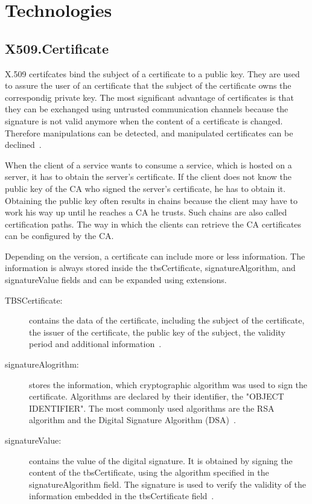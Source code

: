 \section{Technologies}
\subsection{X509.Certificate}
X.509 certifcates bind the subject of a certificate to a public key.
They are used to assure the user of an certificate that the subject of the certificate owns the correspondig private key.
The most significant advantage of certificates is that they can be exchanged using untrusted communication channels because the signature is not valid anymore when the content of a certificate is changed.
Therefore manipulations can be detected, and manipulated certificates can be declined~\cite{x509rfc}.

When the client of a service wants to consume a service, which is hosted on a server, it has to obtain the server's certificate.
If the client does not know the public key of the CA who signed the server's certificate, he has to obtain it.
Obtaining the public key often results in chains because the client may have to work his way up until he reaches a CA he trusts.
Such chains are also called certification paths.
The way in which the clients can retrieve the CA certificates can be configured by the CA.

Depending on the version, a certificate can include more or less information.
The information is always stored inside the tbsCertificate, signatureAlgorithm, and signatureValue fields and can be expanded using extensions.
\begin{description}
	\item[TBSCertificate:] contains the data of the certificate, including the subject of the certificate, the issuer of the certificate, the public key of the subject, the validity period and additional information~\cite{x509rfc}.
	\item[signatureAlogrithm:] stores the information, which cryptographic algorithm was used to sign the certificate.
		Algorithms are declared by their identifier, the "OBJECT IDENTIFIER".
		The most commonly used algorithms are the RSA algorithm and the Digital Signature Algorithm (DSA)~\cite{x509rfc}.
	\item[signatureValue:] contains the value of the digital signature.
		It is obtained by signing the content of the tbsCertificate, using the algorithm specified in the signatureAlgorithm field.
		The signature is used to verify the validity of the information embedded in the tbsCertificate field~\cite{x509rfc}.
\end{description}

